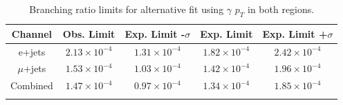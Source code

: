 \begin{table}[h!]
\begin{center}
{\renewcommand{\arraystretch}{1.2}
\begin{tabular}{ccccc}
\hhline{=====}
Channel  	&  Obs. Limit			&	Exp. Limit -$\sigma$	& Exp. Limit	& Exp. Limit +$\sigma$  \\  \hline 
e+jets	& $2.13\times10^{-4}$ 	& $1.31\times10^{-4}$	& $1.82\times10^{-4}$ & $2.42\times10^{-4}$	\\
$\mu$+jets	& $1.53\times10^{-4}$ 	& $1.03\times10^{-4}$	& $1.42\times10^{-4}$ & $1.96\times10^{-4}$	\\
Combined	& $1.47\times10^{-4}$ 	& $0.97\times10^{-4}$	& $1.34\times10^{-4}$ & $1.85\times10^{-4}$	\\
\hhline{=====}
\end{tabular}
\caption{Branching ratio limits for alternative fit using $\gamma$ $p_T$ in both regions.}
}
\end{center}
\end{table}






















